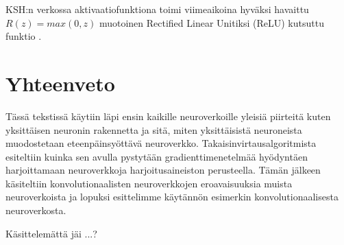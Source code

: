 \documentclass[finnish]{tktltiki2}
\theoremstyle{definition}
\theoremstyle{remark}
\begin{document}
    KSH:n verkossa aktivaatiofunktiona toimi viimeaikoina hyväksi havaittu $R(z) = max(0, z)$ muotoinen Rectified Linear Unitiksi (ReLU) kutsuttu funktio \cite{KSHimagenet2012}.

\section{Yhteenveto} 

Tässä tekstissä käytiin läpi ensin kaikille neuroverkoille yleisiä piirteitä kuten yksittäisen neuronin rakennetta ja sitä, miten yksittäisistä neuroneista muodostetaan eteenpäinsyöttävä neuroverkko. Takaisinvirtausalgoritmista esiteltiin kuinka sen avulla pystytään gradienttimenetelmää hyödyntäen harjoittamaan neuroverkkoja harjoitusaineiston perusteella. Tämän jälkeen käsiteltiin konvolutionaalisten neuroverkkojen eroavaisuuksia muista neuroverkoista ja lopuksi esittelimme käytännön esimerkin konvolutionaalisesta neuroverkosta.

Käsittelemättä jäi ...?







  
  





  
\end{document}

